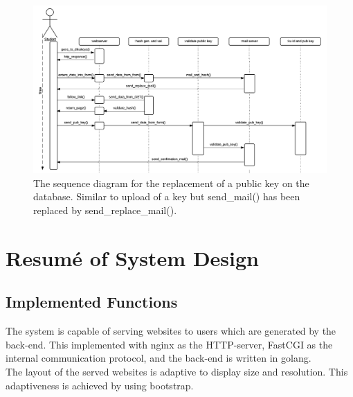 \documentclass[11pt,a4paper]{report}
\begin{document}

\begin{figure}[H]
    \centering
    \includegraphics[width=1.2\textwidth]{pictures/sequence_diagram_replace_new}
     \caption{The sequence diagram for the replacement of a public key on the database. Similar to upload of a key but send\_mail() has been replaced by send\_replace\_mail().}
    \label{fig:use_case_diagram_example_two}
\end{figure}

\section{Resumé of System Design}\label{sec:Systemdesign}
\subsection{Implemented Functions} 
The system is capable of serving websites to users which are generated by the back-end. This implemented with nginx as the HTTP-server, FastCGI as the internal communication protocol, and the back-end is written in golang. \\
The layout of the served websites is adaptive to display size and resolution. This adaptiveness is achieved by using bootstrap. \\
\end{document}
